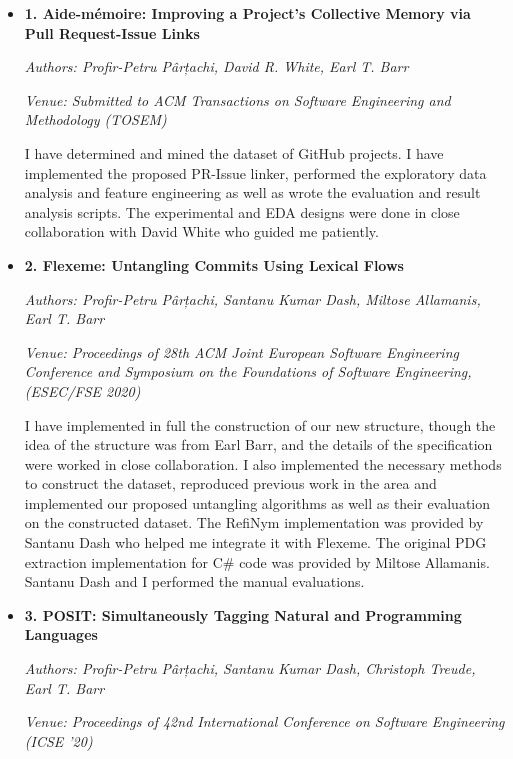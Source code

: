 \begin{itemize}[leftmargin=*]
    \item[]\noindent\textbf{1. Aide-mémoire: Improving a Project’s Collective Memory via Pull
Request-Issue Links} 

    \noindent\emph{Authors: Profir-Petru Pârțachi, David R. White, Earl T. Barr}

    \noindent\emph{Venue: Submitted to ACM Transactions on Software Engineering
    and Methodology (TOSEM)}

    \noindent I have determined and mined the dataset of GitHub projects. I have
    implemented the proposed PR-Issue linker, performed the exploratory data
    analysis and feature engineering as well as wrote the evaluation and result
    analysis scripts. The experimental and EDA designs were done in close
    collaboration with David White who guided me patiently.

    \item[]\noindent\textbf{2. Flexeme: Untangling Commits Using Lexical Flows}

    \noindent\emph{Authors: Profir-Petru Pârțachi, Santanu Kumar Dash, Miltose
    Allamanis, Earl T. Barr}

    \noindent\emph{Venue: Proceedings of 28th ACM Joint European Software
    Engineering Conference and Symposium on the Foundations of Software
    Engineering, (ESEC/FSE 2020)}

    \noindent  I have implemented in full the construction of our new structure,
    though the idea of the structure was from Earl Barr, and the details of the
    specification were worked in close collaboration. I also implemented the
    necessary methods to construct the dataset, reproduced previous work in the
    area and implemented our proposed untangling algorithms as well as their
    evaluation on the constructed dataset. The RefiNym implementation was
    provided by Santanu Dash who helped me integrate it with Flexeme. The
    original PDG extraction implementation for C\# code was provided by Miltose
    Allamanis. Santanu Dash and I performed the manual evaluations.

    \item[]\noindent\textbf{3. POSIT: Simultaneously Tagging Natural and Programming
    Languages} 

    \noindent\emph{Authors: Profir-Petru Pârțachi, Santanu Kumar Dash, Christoph
    Treude, Earl T. Barr}

    \noindent\emph{Venue: Proceedings of 42nd International Conference on
    Software Engineering (ICSE ’20)}


\end{itemize}
